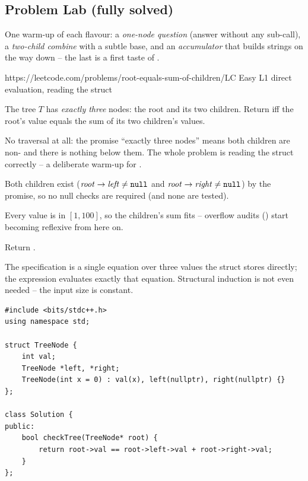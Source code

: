 \subsection{Problem Lab (fully solved)}

One warm-up of each flavour: a \emph{one-node question} (answer without any
sub-call), a \emph{two-child combine} with a subtle base, and an
\emph{accumulator} that builds strings on the way down -- the last is a first
taste of .

  {https://leetcode.com/problems/root-equals-sum-of-children/}{LC Easy L1}
  {direct evaluation, reading the struct}

\begin{problemstatement}
The tree $T$ has \emph{exactly three} nodes: the root and its two children. Return
 iff the root's value equals the sum of its two children's values.
\end{problemstatement}

No traversal at all: the promise ``exactly three nodes'' means both children are
non-\nil{} and there is nothing below them. The whole problem is reading the
struct correctly -- a deliberate warm-up for .

\begin{observation}
Both children exist ($\mathit{root}\to\mathit{left} \neq \texttt{null}$ and
$\mathit{root}\to\mathit{right} \neq \texttt{null}$) by the promise, so no null checks
are required (and none are tested).
\end{observation}
\begin{observation}
Every value is in $[1,100]$, so the children's sum fits  -- overflow
audits () start becoming reflexive from here on.
\end{observation}

Return .

\begin{proofbox}
The specification is a single equation over three values the struct stores
directly; the expression evaluates exactly that equation. Structural induction is
not even needed -- the input size is constant.
\end{proofbox}

\begin{lstlisting}[caption={Root Equals Sum of Children (LeetCode 2236)}, label={lst:c02-root-sum}]
#include <bits/stdc++.h>
using namespace std;

struct TreeNode {
    int val;
    TreeNode *left, *right;
    TreeNode(int x = 0) : val(x), left(nullptr), right(nullptr) {}
};

class Solution {
public:
    bool checkTree(TreeNode* root) {
        return root->val == root->left->val + root->right->val;
    }
};
\end{lstlisting}

